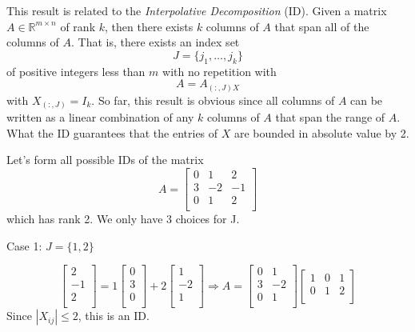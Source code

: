 This result is related to the \emph{Interpolative Decomposition} (ID). Given a matrix $A\in\mathbb{R}^{m \times n}$ of rank $k$, then there exists $k$ columns of $A$ that span all of the columns of $A$. That is, there exists an index set
\begin{equation*}
    J = \{j_1, \ldots, j_k \}
\end{equation*}
of positive integers less than $m$ with no repetition with
\begin{equation*}
    A = A_{(:, J) X}
\end{equation*}
with $X_{(:,J)} = I_k$. So far, this result is obvious since all columns of $A$ can be written as a linear combination of any $k$ columns of $A$ that span the range of $A$. What the ID guarantees that the entries of $X$ are bounded in absolute value by 2.

Let's form all possible IDs of the matrix
\begin{equation*}
    A =
    \begin{bmatrix}
        0 &  1 &  2 \\
        3 & -2 & -1 \\
        0 &  1 &  2 \\
    \end{bmatrix}
\end{equation*}
which has rank 2. We only have 3 choices for J.

Case 1: $J=\{1,2\}$

\begin{equation*}
    \begin{bmatrix}
        2\\
        -1\\
        2\\
    \end{bmatrix}
    =
    1
    \begin{bmatrix}
        0\\
        3\\
        0\\
    \end{bmatrix}
    +2
    \begin{bmatrix}
        1\\
        -2\\
        1\\
    \end{bmatrix}
    \Rightarrow
    A =
    \begin{bmatrix}
        0&1\\
        3&-2\\
        0&1\\
    \end{bmatrix}
    \begin{bmatrix}
        1&0&1\\
        0&1&2\\
    \end{bmatrix}
\end{equation*}
Since $|X_{ij}|\leq 2$, this is an ID.

